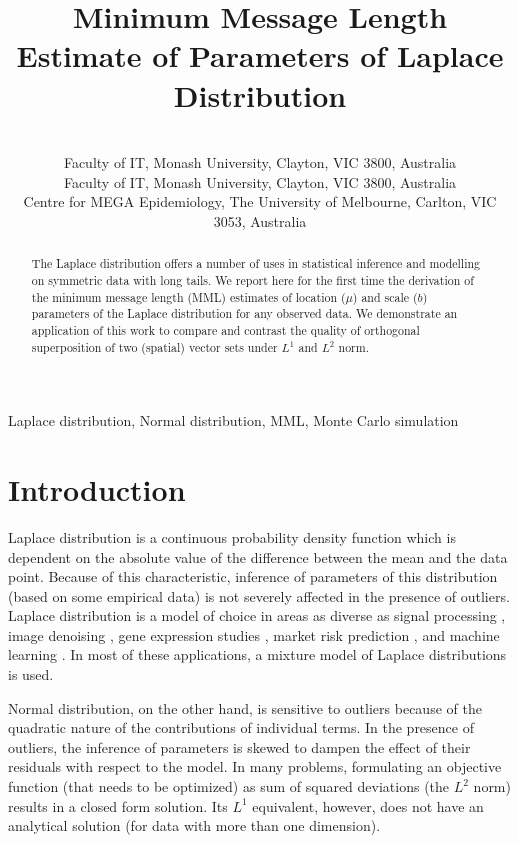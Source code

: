 \documentclass[wcp]{jmlr}
\title[MML Laplace]{Minimum Message Length Estimate of Parameters of Laplace Distribution}
\author{\Name{Parthan Kasarapu} \Email{parthan.kasarapu@monash.edu}\\
  \addr Faculty of IT, Monash University, Clayton, VIC 3800, Australia
  \AND
  \Name{Lloyd Allison} \Email{lloyd.allison@monash.edu}\\
  \addr Faculty of IT, Monash University, Clayton, VIC 3800, Australia
  \AND
  \Name{Enes Makalic} \Email{emakalic@unimelb.edu.au}\\
  \addr Centre for MEGA Epidemiology, The University of Melbourne, Carlton, VIC 3053, Australia
 }
\begin{document}
\maketitle

\begin{abstract}
The Laplace distribution offers a number of uses in statistical inference and
modelling on symmetric data with long tails. We report here for the first time
the derivation of the minimum message length (MML) estimates of location ($\mu$) and 
scale ($b$) parameters of the Laplace distribution for any observed data. 
We demonstrate an application of this work to compare and contrast the
quality of orthogonal superposition of two (spatial) vector sets under 
$L^1$ and $L^2$ norm.
\end{abstract}

\begin{keywords}
Laplace distribution, Normal distribution, MML, Monte Carlo simulation
\end{keywords}

\section{Introduction}
Laplace distribution is a continuous probability density function which is dependent on
the absolute value of the difference between the mean and the data point. Because of
this characteristic, inference of parameters of this distribution (based on some 
empirical data) is not severely affected in the presence of outliers. Laplace distribution
is a model of choice in areas as diverse as signal processing 
\citep{laplace-signal-processing}, image denoising \citep{image-denoising},
gene expression studies \citep{Bhowmick01102006}, market risk prediction
\citep{haas2005modeling}, and machine learning \citep{Cord:2006:FSR:1167556.1167570}.
In most of these applications, a mixture model of Laplace distributions is used. 

Normal distribution, on the other hand, is sensitive to outliers because of the quadratic 
nature of the contributions of individual terms. In the presence 
of outliers, the inference of parameters is skewed to dampen the effect of their residuals 
with respect to the model. In many problems, formulating an objective function (that needs 
to be optimized) as sum of squared deviations (the $L^2$ norm) results in a closed
form solution. Its $L^1$ equivalent, however, does not have an analytical solution
(for data with more than one dimension). 
\end{document}
